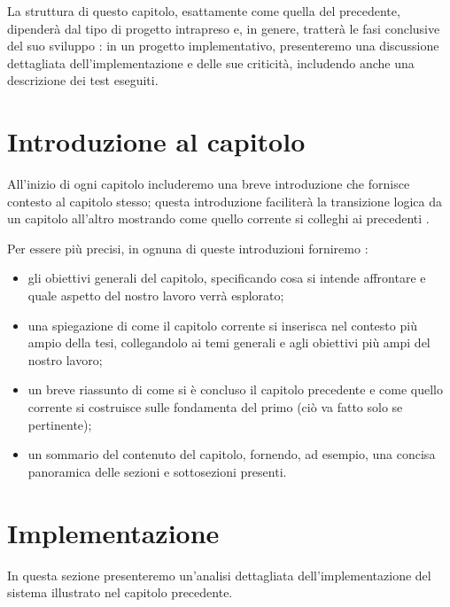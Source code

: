 La struttura di questo capitolo, esattamente come quella del precedente, dipenderà dal tipo di progetto intrapreso e, in genere, tratterà le fasi conclusive del suo sviluppo \cite{unibz2022thesis}: in un progetto implementativo, presenteremo una discussione dettagliata dell'implementazione e delle sue criticità, includendo anche una descrizione dei test eseguiti.

\section{Introduzione al capitolo}

All'inizio di ogni capitolo includeremo una breve introduzione che fornisce contesto al capitolo stesso; questa introduzione faciliterà la transizione logica da un capitolo all'altro mostrando come quello corrente si colleghi ai precedenti \cite{zobel2015writing}.

\medskip

Per essere più precisi, in ognuna di queste introduzioni forniremo \cite{unibz2022thesis}:
\begin{itemize}

\item gli obiettivi generali del capitolo, specificando cosa si intende affrontare e quale aspetto del nostro lavoro verrà esplorato;

\item una spiegazione di come il capitolo corrente si inserisca nel contesto più ampio della tesi, collegandolo ai temi generali e agli obiettivi più ampi del nostro lavoro;

\item un breve riassunto di come si è concluso il capitolo precedente e come quello corrente si costruisce sulle fondamenta del primo (ciò va fatto solo se pertinente);

\item un sommario del contenuto del capitolo, fornendo, ad esempio, una concisa panoramica delle sezioni e sottosezioni presenti.

\end{itemize}

\section{Implementazione}

In questa sezione presenteremo un'analisi dettagliata dell'implementazione del sistema illustrato nel capitolo precedente.


